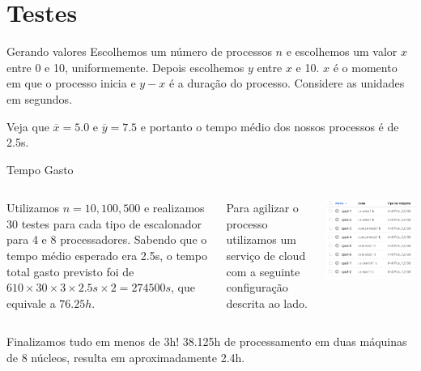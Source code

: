 \documentclass{beamer}
\begin{document}
\section{Testes}

\begin{frame}{Gerando valores}
	\justifying
	Escolhemos um número de processos $n$ e escolhemos um valor $x$ entre  0 e 10, uniformemente. Depois escolhemos $y$ entre $x$ e 10. $x$ é o momento em que o processo inicia e $y-x$ é a duração do processo. Considere as unidades em segundos.
	
	Veja que $\overline{x} = 5.0$ e $\overline{y} = 7.5$ e portanto o tempo médio dos nossos processos é de 2.5s.
\end{frame}


\begin{frame}{Tempo Gasto}
	\begin{columns}[T,onlytextwidth]
		\justifying
		Utilizamos $n = 10, 100, 500$ e realizamos 30 testes para cada tipo de escalonador para 4 e 8 processadores. Sabendo que o tempo médio esperado era 2.5s, o tempo total gasto previsto foi de $610 \times 30 \times 3 \times 2.5s \times 2 = 274500s$, que equivale a $76.25h$.
		
		Para agilizar o processo utilizamos um serviço de cloud com a seguinte configuração descrita ao lado.
		
		
		\begin{center}
			\includegraphics[scale=0.4]{cloud}
		\end{center}
		
	\end{columns}
	
	
	{\tiny *Finalizamos tudo em menos de 3h! 38.125h de processamento em duas máquinas de 8 núcleos, resulta em aproximadamente 2.4h.}
\end{frame}
\end{document}
